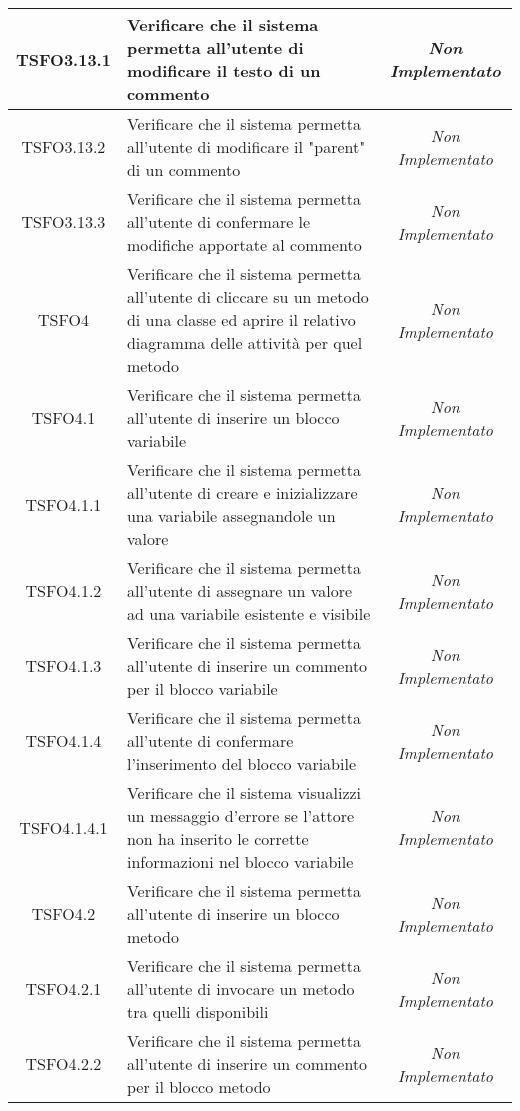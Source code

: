 \begin{longtable}{|c|>{}m{8cm}|c|}
\hypertarget{TSFO3.13.1}{TSFO3.13.1} & Verificare che il sistema permetta all'utente di modificare il testo di un commento & \textit{Non Implementato}\\ \hline
\hypertarget{TSFO3.13.2}{TSFO3.13.2} & Verificare che il sistema permetta all'utente di modificare il "parent" di un commento & \textit{Non Implementato}\\ \hline
\hypertarget{TSFO3.13.3}{TSFO3.13.3} & Verificare che il sistema permetta all'utente di confermare le modifiche apportate al commento & \textit{Non Implementato}\\ \hline
\hypertarget{TSFO4}{TSFO4} & Verificare che il sistema permetta all'utente di cliccare su un metodo di una classe ed aprire il relativo diagramma delle attività per quel metodo & \textit{Non Implementato}\\ \hline
\hypertarget{TSFO4.1}{TSFO4.1} & Verificare che il sistema permetta all'utente di inserire un blocco variabile & \textit{Non Implementato}\\ \hline
\hypertarget{TSFO4.1.1}{TSFO4.1.1} & Verificare che il sistema permetta all'utente di creare e inizializzare una variabile assegnandole un valore & \textit{Non Implementato}\\ \hline
\hypertarget{TSFO4.1.2}{TSFO4.1.2} & Verificare che il sistema permetta all'utente di assegnare un valore ad una variabile esistente e visibile & \textit{Non Implementato}\\ \hline
\hypertarget{TSFO4.1.3}{TSFO4.1.3} & Verificare che il sistema permetta all'utente di inserire un commento per il blocco variabile & \textit{Non Implementato}\\ \hline
\hypertarget{TSFO4.1.4}{TSFO4.1.4} & Verificare che il sistema permetta all'utente di confermare l'inserimento del blocco variabile & \textit{Non Implementato}\\ \hline
\hypertarget{TSFO4.1.4.1}{TSFO4.1.4.1} & Verificare che il sistema visualizzi un messaggio d'errore se l'attore non ha inserito le corrette informazioni nel blocco variabile & \textit{Non Implementato}\\ \hline
\hypertarget{TSFO4.2}{TSFO4.2} & Verificare che il sistema permetta all'utente di inserire un blocco metodo & \textit{Non Implementato}\\ \hline
\hypertarget{TSFO4.2.1}{TSFO4.2.1} & Verificare che il sistema permetta all'utente di invocare un metodo tra quelli disponibili & \textit{Non Implementato}\\ \hline
\hypertarget{TSFO4.2.2}{TSFO4.2.2} & Verificare che il sistema permetta all'utente di inserire un commento per il blocco metodo & \textit{Non Implementato}\\ \hline

\end{longtable}
